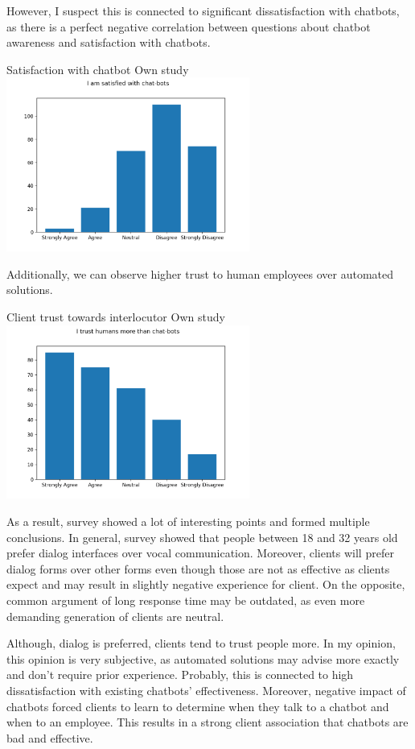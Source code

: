 However, I suspect this is connected to significant dissatisfaction with chatbots, as there is a perfect negative correlation between questions about chatbot awareness and satisfaction with chatbots.

\mtfigure
{Satisfaction with chatbot}
{Own study}
{
    \includegraphics[width=0.6\textwidth,height=\textheight,keepaspectratio]{survey/8_i_am_satisfied_with_chat-bots.png}
}    

Additionally, we can observe higher trust to human employees over automated solutions.

\mtfigure
{Client trust towards interlocutor}
{Own study}
{
    \includegraphics[width=0.6\textwidth,height=\textheight,keepaspectratio]{survey/9_i_trust_humans_more_than_chat-bots.png}
}

As a result, survey showed a lot of interesting points and formed multiple conclusions.
In general, survey showed that people between 18 and 32 years old prefer dialog interfaces over vocal communication.
Moreover, clients will prefer dialog forms over other forms even though those are not as effective as clients expect and may result in slightly negative experience for client.
On the opposite, common argument of long response time may be outdated, as even more demanding generation of clients are neutral.

Although, dialog is preferred, clients tend to trust people more.
In my opinion, this opinion is very subjective, as automated solutions may advise more exactly and don't require prior experience.
Probably, this is connected to high dissatisfaction with existing chatbots' effectiveness.
Moreover, negative impact of chatbots forced clients to learn to determine when they talk to a chatbot and when to an employee.
This results in a strong client association that chatbots are bad and effective.

